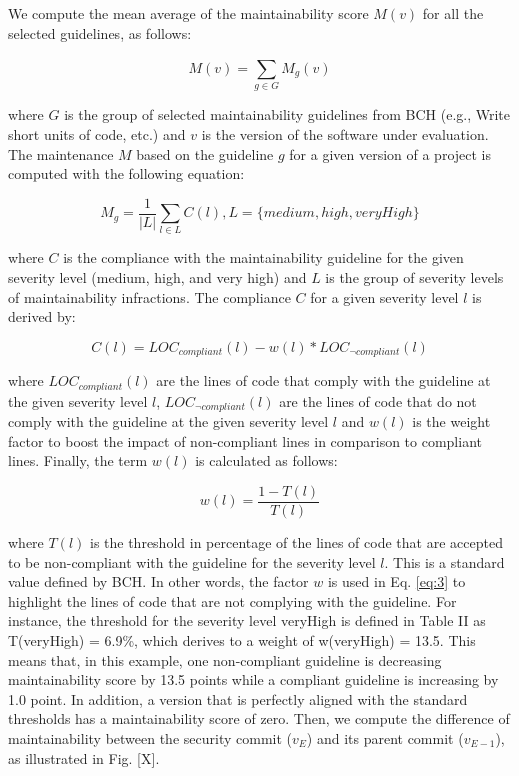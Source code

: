 \documentclass[10pt,conference]{IEEEtran}
\begin{document}
We compute the mean average of the maintainability score $M(v)$ for all the selected guidelines, as follows:

\begin{equation}
    M(v) = \sum_{g \in G}^{} M_{g}(v)
\end{equation}

where $G$ is the group of selected maintainability guidelines from BCH (e.g., Write short units of code, etc.) and $v$ is the
version of the software under evaluation. The maintenance $M$ based on the guideline $g$ for a given version of a project is computed with the following equation:

\begin{equation}
    M_{g} = \frac{1}{|L|} \sum_{l \in L}^{} C(l) , L = \{medium, high, veryHigh\}
\end{equation}

where $C$ is the compliance with the maintainability guideline for the given severity level (medium, high, and very high) and
$L$ is the group of severity levels of maintainability infractions. The compliance $C$ for a given severity level $l$ is derived by:

\begin{equation}\label{eq:3}
    C(l) = LOC_{compliant}(l) - w(l) * LOC_{\neg compliant}(l)
\end{equation}

where $LOC_{compliant}(l)$ are the lines of code that comply with the guideline at the given severity level $l$, $LOC_{\neg compliant}(l)$ are the lines of code that do not comply with the guideline at the given
severity level $l$ and $w(l)$ is the weight factor to boost the impact of
non-compliant lines in comparison to compliant lines. Finally, the term $w(l)$ is calculated as follows:

\begin{equation}
    w(l) = \frac{1 - T(l)}{T(l)}
\end{equation}

where $T(l)$ is the threshold in percentage of the lines of code that are accepted to be non-compliant with the guideline for the severity level $l$. This is a standard value defined by BCH. In other words, the factor $w$ is used in Eq. \ref{eq:3} to highlight the lines of code that are not complying with the guideline. For instance, the threshold for the severity level veryHigh is defined in Table II as T(veryHigh) = 6.9\%, which derives to a weight of w(veryHigh) = 13.5. This means that, in this example, one non-compliant guideline is decreasing maintainability score by 13.5 points while a compliant guideline is increasing by 1.0 point. In addition, a version that is perfectly aligned with the standard thresholds has a maintainability score of zero. Then, we compute the difference of maintainability between the security commit ($v_E$) and its parent commit ($v_{E−1}$), as illustrated in Fig. [X].
\end{document}

